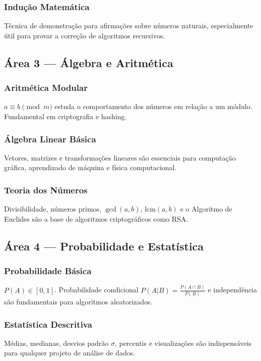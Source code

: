 \documentclass[12pt, a4paper]{article}
\begin{document}
\subsubsection*{Indução Matemática}
Técnica de demonstração para afirmações sobre números naturais, especialmente útil para
provar a correção de algoritmos recursivos.

\subsection*{Área 3 --- Álgebra e Aritmética}

\subsubsection*{Aritmética Modular}
$a \equiv b \pmod{m}$ estuda o comportamento dos números em relação a um módulo.
Fundamental em criptografia e hashing.

\subsubsection*{Álgebra Linear Básica}
Vetores, matrizes e transformações lineares são essenciais para computação gráfica,
aprendizado de máquina e física computacional.

\subsubsection*{Teoria dos Números}
Divisibilidade, números primos, $\gcd(a,b)$, $\text{lcm}(a,b)$ e o Algoritmo de Euclides
são a base de algoritmos criptográficos como RSA.

\subsection*{Área 4 --- Probabilidade e Estatística}

\subsubsection*{Probabilidade Básica}
$P(A) \in [0,1]$. Probabilidade condicional $P(A|B) = \frac{P(A \cap B)}{P(B)}$ e
independência são fundamentais para algoritmos aleatorizados.

\subsubsection*{Estatística Descritiva}
Médias, medianas, desvios padrão $\sigma$, percentis e visualizações são indispensáveis
para qualquer projeto de análise de dados.
\end{document}
